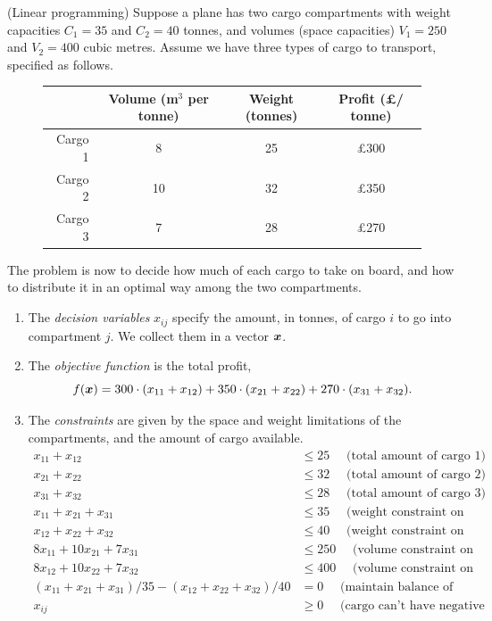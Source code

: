 \begin{example}\label{ex:2}(Linear programming)
 Suppose a plane has two cargo compartments with weight capacities $C_1=35$ and $C_2=40$ tonnes, and volumes (space capacities) $V_1=250$ and $V_2=400$ cubic metres. Assume we have three types of cargo to transport, specified as follows.
 
 \begin{figure}[h!]
 \begin{tabular}{r | c | c | c}
           & Volume (m$^3$ per tonne) & Weight (tonnes) & Profit (\pounds / tonne)\\
           \hline 
   Cargo 1 &  8    &  25 & \pounds 300\\
   \hline 
   Cargo 2 &  10    &  32 & \pounds 350\\
   \hline
   Cargo 3 & 7    & 28  & \pounds 270\\
   \hline
 \end{tabular}
 \end{figure}

 The problem is now to decide how much of each cargo to take on board, and how to distribute it in an optimal way among the two compartments.
 \begin{enumerate}
  \item The {\em decision variables} $x_{ij}$ specify the amount, in tonnes, of cargo $i$ to go into compartment $j$. We collect them in a vector $\bm{x}$.
  \item The {\em objective function} is the total profit, 
  \begin{equation*}
   f(\bm{x}) = 300\cdot (x_{11}+x_{12})+ 350\cdot (x_{21}+x_{22})+270\cdot (x_{31}+x_{32}).
  \end{equation*}
\item The {\em constraints} are given by the space and weight limitations of the compartments, and the amount of cargo available.
{\small
\begin{align*}
 x_{11}+x_{12} & \leq 25 \quad \text{ (total amount of cargo 1)}\\ 
 x_{21}+x_{22} & \leq 32 \quad \text{ (total amount of cargo 2)}\\ 
 x_{31}+x_{32} & \leq 28 \quad \text{ (total amount of cargo 3)}\\
 x_{11}+x_{21}+x_{31} & \leq 35 \quad \text{ (weight constraint on compartment 1)}\\
 x_{12}+x_{22}+x_{32} & \leq 40 \quad \text{ (weight constraint on compartment 2)}\\
 8x_{11}+10x_{21}+7x_{31} & \leq 250 \quad \text{ (volume constraint on compartment 1)}\\
 8x_{12}+10x_{22}+7x_{32} & \leq 400 \quad \text{ (volume constraint on compartment 2)}\\
 (x_{11}+x_{21}+x_{31})/35 - (x_{12}+x_{22}+x_{32})/40 &= 0 \quad \text{ (maintain balance of weight ratio)}\\
 x_{ij} &\geq 0 \quad \text{ (cargo can't have negative weight)}
\end{align*}}
 \end{enumerate}


\end{example}
